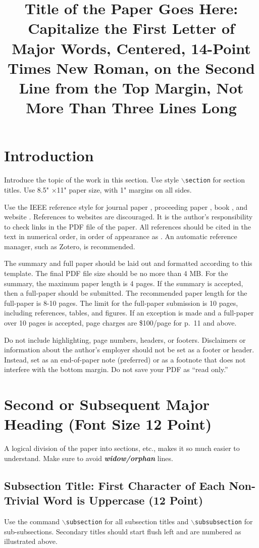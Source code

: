 \documentclass[]{ANStopical}
\title{Title of the Paper Goes Here: Capitalize the First Letter of Major Words, Centered, 14-Point Times New Roman, on the Second Line from the Top Margin, Not More Than Three Lines Long}
\begin{document}
\section{Introduction}\label{sec:1}
Introduce the topic of the work in this section.
Use style \texttt{$\backslash$section} for section titles. Use 8.5" ×11" paper size, with 1" margins on all sides.

Use the IEEE reference style for journal paper \cite{journal}, proceeding paper \cite{conf_paper}, book \cite{book}, and website \cite{website}.
References to websites are discouraged. It is the author’s responsibility to check links in the PDF file of the paper.
All references should be cited in the text in numerical order, in order of appearance as \cite{book,website,proc_paper}. An automatic reference manager, such as Zotero, is recommended.

The summary and full paper should be laid out and formatted according to this template.
The final PDF file size should be no more than 4 MB.
For the summary, the maximum paper length is 4 pages.
If the summary is accepted, then a full-paper should be submitted.
The recommended paper length for the full-paper is 8-10 pages.
The limit for the full-paper submission is 10 pages, including references, tables, and figures.
If an exception is made and a full-paper over 10 pages is accepted, page charges are \$100/page for p.~11 and above.

Do not include highlighting, page numbers, headers, or footers.
Disclaimers or information about the author’s employer should not be set as a footer or header.
Instead, set as an end-of-paper note (preferred) or as a footnote that does not interfere with the bottom margin. Do not save your PDF as ``read only.''

 
\section{Second or Subsequent Major Heading (Font Size 12 Point)} \label{sec:2}

A logical division of the paper into sections, etc., makes it so much easier to understand.
Make sure to avoid \textbf{\textit{widow/orphan}}  lines.

\subsection{Subsection Title: First Character of Each Non-Trivial Word is Uppercase (12 Point)}
Use the command \texttt{$\backslash$subsection} for all subsection titles and \texttt{$\backslash$subsubsection}
for sub-subsections.
Secondary titles should start flush left and are numbered as illustrated above.
\end{document}
